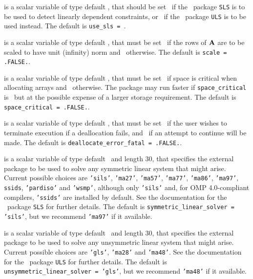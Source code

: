 \documentclass{galahad}
\newcommand{\packagename}{FDC}
\newcommand{\fullpackagename}{\libraryname\_\-\packagename}
\begin{document}
\begin{description}

 is a scalar variable of type default
\logical, that should be set \true\ if the
\libraryname\ package {\tt SLS} is to be used
to detect linearly dependent constraints, or \false\ if
the \libraryname\ package {\tt ULS} is to be used instead.
The default is {\tt use\_sls = }\false.

 is a scalar variable of type default \logical,
that must be set \true\ if the rows of ${\mathbf{A}}$ are to be scaled to
have unit (infinity) norm and  \false\ otherwise.
The default is {\tt scale = .FALSE.}.

 is a scalar variable of type default \logical,
that must be set \true\ if space is critical when allocating arrays
and  \false\ otherwise. The package may run faster if
{\tt space\_critical} is \false\ but at the possible expense of a larger
storage requirement. The default is {\tt space\_critical = .FALSE.}.

 is a scalar variable of type default \logical,
that must be set \true\ if the user wishes to terminate execution if
a deallocation  fails, and \false\ if an attempt to continue
will be made. The default is {\tt deallocate\_error\_fatal = .FALSE.}.

 is a scalar variable of type default
\character\ and length 30, that specifies the external package to be used to
solve any symmetric linear system that might arise. Current possible
choices are {\tt 'sils'}, {\tt 'ma27'}, {\tt 'ma57'}, {\tt 'ma77'},
{\tt 'ma86'}, {\tt 'ma97'}, {\tt ssids}, {\tt 'pardiso'}
and {\tt 'wsmp'},
although only {\tt 'sils'} and, for OMP 4.0-compliant compilers,
{\tt 'ssids'} are installed by default.
See the documentation for the \galahad\ package {\tt SLS} for further details.
The default is {\tt symmetric\_linear\_solver = 'sils'},
but we recommend {\tt 'ma97'} if it available.

 is a scalar variable of type default
\character\ and length 30, that specifies the external package to be used to
solve any unsymmetric linear system that might arise. Current possible
choices are {\tt 'gls'}, {\tt 'ma28'} and {\tt 'ma48'}.
See the documentation for the \galahad\ package {\tt ULS} for further details.
The default is {\tt unsymmetric\_linear\_solver = 'gls'},
but we recommend {\tt 'ma48'} if it available.


\end{description}
\end{document}
